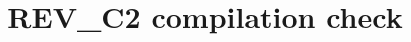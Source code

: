 \documentclass[11pt,reqno]{amsart}
\theoremstyle{plain}
\theoremstyle{definition}
\theoremstyle{remark}
\numberwithin{equation}{section}
\begin{document}
\title{REV\_C2 compilation check}
\maketitle
\setcounter{section}{7}

\appendix
\setcounter{section}{2}

\end{document}
